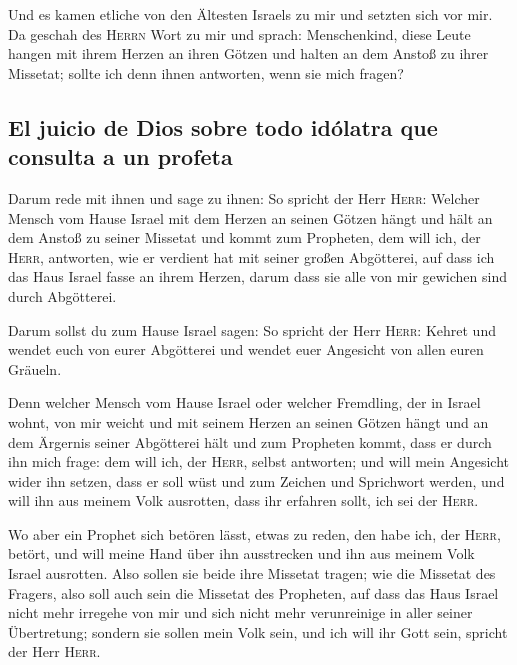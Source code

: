  Und es kamen etliche von den Ältesten Israels zu mir und
setzten sich vor mir.  Da geschah des \textsc{Herrn} Wort
zu mir und sprach:  Menschenkind, diese Leute hangen mit
ihrem Herzen an ihren Götzen und halten an dem Anstoß zu ihrer Missetat;
sollte ich denn ihnen antworten, wenn sie mich fragen?

\hypertarget{el-juicio-de-dios-sobre-todo-iduxf3latra-que-consulta-a-un-profeta}{%
\subsection{El juicio de Dios sobre todo idólatra que consulta a un
profeta}\label{el-juicio-de-dios-sobre-todo-iduxf3latra-que-consulta-a-un-profeta}}

 Darum rede mit ihnen und sage zu ihnen: So spricht der
Herr \textsc{Herr}: Welcher Mensch vom Hause Israel mit dem Herzen an
seinen Götzen hängt und hält an dem Anstoß zu seiner Missetat und kommt
zum Propheten, dem will ich, der \textsc{Herr}, antworten, wie er
verdient hat mit seiner großen Abgötterei,  auf dass ich
das Haus Israel fasse an ihrem Herzen, darum dass sie alle von mir
gewichen sind durch Abgötterei.

 Darum sollst du zum Hause Israel sagen: So spricht der
Herr \textsc{Herr}: Kehret und wendet euch von eurer Abgötterei und
wendet euer Angesicht von allen euren Gräueln.

 Denn welcher Mensch vom Hause Israel oder welcher
Fremdling, der in Israel wohnt, von mir weicht und mit seinem Herzen an
seinen Götzen hängt und an dem Ärgernis seiner Abgötterei hält und zum
Propheten kommt, dass er durch ihn mich frage: dem will ich, der
\textsc{Herr}, selbst antworten;  und will mein Angesicht
wider ihn setzen, dass er soll wüst und zum Zeichen und Sprichwort
werden, und will ihn aus meinem Volk ausrotten, dass ihr erfahren sollt,
ich sei der \textsc{Herr}.

 Wo aber ein Prophet sich betören lässt, etwas zu reden,
den habe ich, der \textsc{Herr}, betört, und will meine Hand über ihn
ausstrecken und ihn aus meinem Volk Israel ausrotten. 
Also sollen sie beide ihre Missetat tragen; wie die Missetat des
Fragers, also soll auch sein die Missetat des Propheten, 
auf dass das Haus Israel nicht mehr irregehe von mir und sich nicht mehr
verunreinige in aller seiner Übertretung; sondern sie sollen mein Volk
sein, und ich will ihr Gott sein, spricht der Herr \textsc{Herr}.

